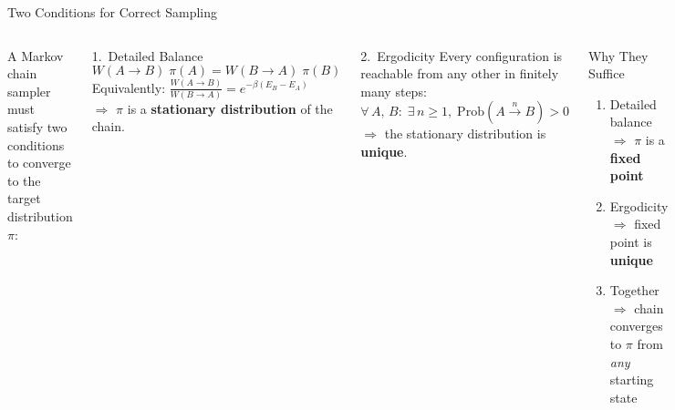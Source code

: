 \documentclass[10pt,aspectratio=169]{beamer}
\begin{document}
\begin{frame}{Two Conditions for Correct Sampling}
  \begin{columns}[T]
    A Markov chain sampler must satisfy two conditions to converge to the target distribution $\pi$:
    \begin{block}{1.\ Detailed Balance}
      \vspace{-0.5em}
      \[
        W(A \to B)\;\pi(A) = W(B \to A)\;\pi(B)
      \]
      \vspace{-0.8em}
      {\small Equivalently: $\frac{W(A \to B)}{W(B \to A)} = e^{-\beta(E_B - E_A)}$\\[4pt]
      $\Longrightarrow$ $\pi$ is a \textbf{stationary distribution} of the chain.}
    \end{block}
    \begin{block}{2.\ Ergodicity}
      \vspace{-0.3em}
      {\small Every configuration is reachable from any other in finitely many steps:
      \[
        \forall\, A,\,B:\;\exists\, n \geq 1,\;\mathrm{Prob}(A \xrightarrow{n} B) > 0
      \]
      \vspace{-0.5em}
      $\Longrightarrow$ the stationary distribution is \textbf{unique}.}
    \end{block}

    \begin{exampleblock}{Why They Suffice}
      \begin{enumerate}\small
        \item Detailed balance $\Rightarrow$ $\pi$ is a \textbf{fixed point}
        \item Ergodicity $\Rightarrow$ fixed point is \textbf{unique}
        \item Together $\Rightarrow$ chain converges to $\pi$ from \emph{any} starting state
      \end{enumerate}
    \end{exampleblock}
    \vspace{0.5em}
    \centering
  \end{columns}
\end{frame}
\end{document}

